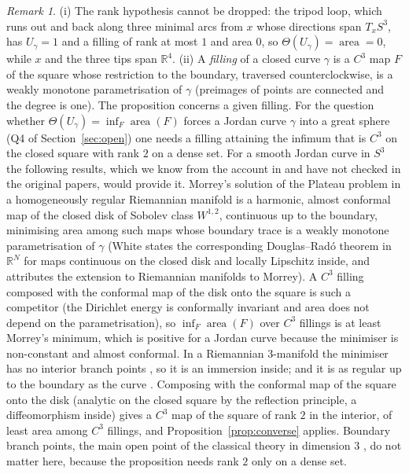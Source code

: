 \documentclass[11pt,reqno]{amsart}
\theoremstyle{definition}
\theoremstyle{remark}
\newtheorem{remark}[theorem]{Remark}
\numberwithin{equation}{section}
\newcommand{\R}{\mathbb{R}}
\begin{document}
\begin{remark}\label{rem:converse}
(i) The rank hypothesis cannot be dropped: the tripod loop, which runs out and back along three minimal arcs from $x$ whose directions span
$T_xS^3$, has $U_\gamma=1$ and a filling of rank at most $1$ and area $0$, so $\Theta(U_\gamma)=\operatorname{area}=0$, while $x$ and the three tips span $\R^4$.
(ii) A \emph{filling} of a closed curve $\gamma$ is a $C^3$ map $F$ of the square whose restriction to the boundary, traversed counterclockwise, is
a weakly monotone parametrisation of $\gamma$ (preimages of points are connected and the degree is one).  The proposition concerns a given
filling.  For the question whether $\Theta(U_\gamma)=\inf_F\operatorname{area}(F)$ forces a Jordan curve $\gamma$ into a
great sphere (Q4 of Section~\ref{sec:open}) one needs a filling attaining the infimum that is $C^3$ on the closed square with rank $2$ on a
dense set.  For a smooth Jordan curve in $S^3$ the following results, which we know from the account in \cite[\S4]{White16}
and have not checked in the original papers, would provide it.  Morrey's solution of the Plateau problem in a homogeneously regular
Riemannian manifold \cite{Morrey48} is a harmonic, almost conformal map of the closed disk of Sobolev class $W^{1,2}$, continuous up to the
boundary, minimising area among such maps whose boundary trace is a weakly monotone parametrisation of $\gamma$ (White states the
corresponding Douglas--Rad\'o theorem in $\R^N$ for maps continuous on the closed disk and locally Lipschitz inside, and attributes the
extension to Riemannian manifolds to Morrey).  A $C^3$ filling composed with the conformal map of the disk onto the square is such a
competitor (the Dirichlet energy is conformally invariant and area does not depend on the parametrisation), so $\inf_F\operatorname{area}(F)$ over
$C^3$ fillings is at least Morrey's minimum, which is positive for a Jordan curve because the minimiser is non-constant and almost
conformal.  In a Riemannian $3$-manifold the minimiser has no interior branch points
\cite{Osserman70,Gulliver73}, so it is an immersion inside; and it is as regular up to the boundary as the curve
\cite{Hildebrandt69,HH70}.  Composing with the conformal map of the square onto the disk (analytic on the closed square by the reflection
principle, a diffeomorphism inside) gives a $C^3$ map of the square of rank $2$ in the interior, of least area among $C^3$ fillings, and
Proposition~\ref{prop:converse} applies.  Boundary branch points, the main open point of the classical theory in dimension $3$
\cite{White16}, do not matter here, because the proposition needs rank $2$ only on a dense set.
\end{remark}
\end{document}
